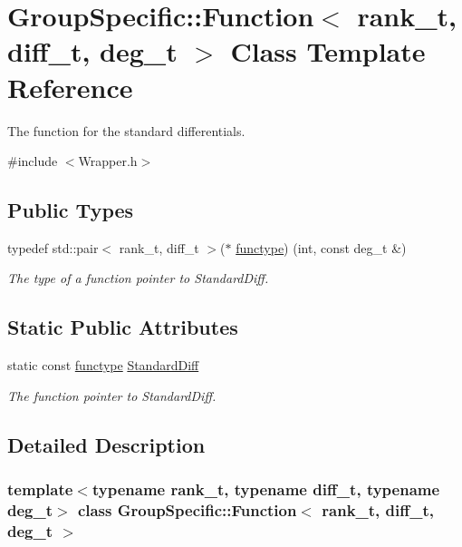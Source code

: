 \hypertarget{classGroupSpecific_1_1Function}{}\section{Group\+Specific\+:\+:Function$<$ rank\+\_\+t, diff\+\_\+t, deg\+\_\+t $>$ Class Template Reference}
\label{classGroupSpecific_1_1Function}


The function for the standard differentials.  




{\ttfamily \#include $<$Wrapper.\+h$>$}

\subsection*{Public Types}
\begin{DoxyCompactItemize}
\item 
typedef std\+::pair$<$ rank\+\_\+t, diff\+\_\+t $>$($\ast$ \hyperlink{classGroupSpecific_1_1Function_a16b2712611a10d8cc8034b9bdf89af06}{functype}) (int, const deg\+\_\+t \&)
\begin{DoxyCompactList}\small\item\em The type of a function pointer to Standard\+Diff. \end{DoxyCompactList}\end{DoxyCompactItemize}
\subsection*{Static Public Attributes}
\begin{DoxyCompactItemize}
\item 
static const \hyperlink{classGroupSpecific_1_1Function_a16b2712611a10d8cc8034b9bdf89af06}{functype} \hyperlink{classGroupSpecific_1_1Function_a8ead55e2f2e2bbda4deea3964793498d}{Standard\+Diff}
\begin{DoxyCompactList}\small\item\em The function pointer to Standard\+Diff. \end{DoxyCompactList}\end{DoxyCompactItemize}


\subsection{Detailed Description}
\subsubsection*{template$<$typename rank\+\_\+t, typename diff\+\_\+t, typename deg\+\_\+t$>$\newline
class Group\+Specific\+::\+Function$<$ rank\+\_\+t, diff\+\_\+t, deg\+\_\+t $>$}

